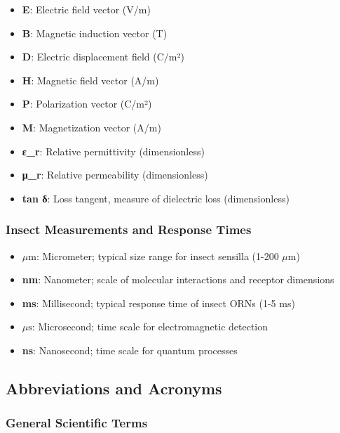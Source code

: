\documentclass[
  13pt,
  a4paperpaper,
  12pt]{article}
\providecommand{\tightlist}{%
  \setlength{\itemsep}{0pt}\setlength{\parskip}{0pt}}
\begin{document}
\begin{itemize}
\tightlist
\item
  \textbf{E}: Electric field vector (V/m)
\item
  \textbf{B}: Magnetic induction vector (T)
\item
  \textbf{D}: Electric displacement field (C/m²)
\item
  \textbf{H}: Magnetic field vector (A/m)
\item
  \textbf{P}: Polarization vector (C/m²)
\item
  \textbf{M}: Magnetization vector (A/m)
\item
  \textbf{ε\_r}: Relative permittivity (dimensionless)
\item
  \textbf{μ\_r}: Relative permeability (dimensionless)
\item
  \textbf{tan δ}: Loss tangent, measure of dielectric loss
  (dimensionless)
\end{itemize}

\subsubsection{Insect Measurements and Response
Times}\label{insect-measurements-and-response-times}

\begin{itemize}
\tightlist
\item
  \textbf{\(\mu\mathrm{m}\)}: Micrometer; typical size range for insect
  sensilla (1-200 \(\mu\mathrm{m}\))
\item
  \textbf{nm}: Nanometer; scale of molecular interactions and receptor
  dimensions
\item
  \textbf{ms}: Millisecond; typical response time of insect ORNs (1-5
  ms)
\item
  \textbf{\(\mu\mathrm{s}\)}: Microsecond; time scale for
  electromagnetic detection
\item
  \textbf{ns}: Nanosecond; time scale for quantum processes
\end{itemize}

\subsection{Abbreviations and
Acronyms}\label{abbreviations-and-acronyms}

\subsubsection{General Scientific Terms}\label{general-scientific-terms}
\end{document}
